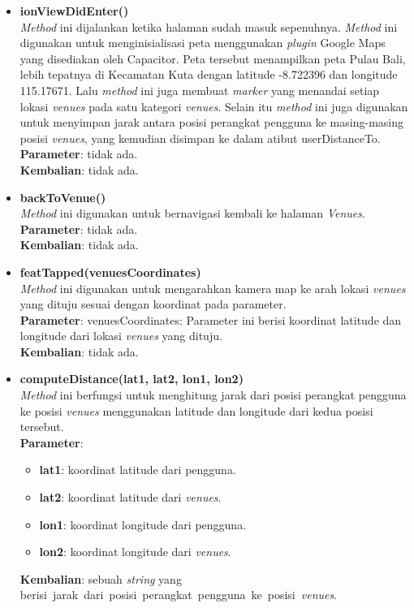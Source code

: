 \begin{enumerate}
\begin{itemize}
					\item \textbf{ionViewDidEnter()} \\
						\textit{Method} ini dijalankan ketika halaman sudah masuk sepenuhnya. \textit{Method} ini digunakan untuk menginisialisasi peta menggunakan \textit{plugin} Google Maps yang disediakan oleh Capacitor. Peta tersebut menampilkan peta Pulau Bali, lebih tepatnya di Kecamatan Kuta dengan latitude -8.722396 dan longitude 115.17671. Lalu \textit{method} ini juga membuat \textit{marker} yang menandai setiap lokasi \textit{venues} pada satu kategori \textit{venues}. Selain itu \textit{method} ini juga digunakan untuk menyimpan jarak antara posisi perangkat pengguna ke masing-masing posisi \textit{venues}, yang kemudian disimpan ke dalam atibut userDistanceTo.\\
						\textbf{Parameter}: tidak ada. \\
						\textbf{Kembalian}: tidak ada.
						
					\item \textbf{backToVenue()} \\
						\textit{Method} ini digunakan untuk bernavigasi kembali ke halaman \textit{Venues}. \\
						\textbf{Parameter}: tidak ada. \\
						\textbf{Kembalian}: tidak ada.
						
					\item \textbf{featTapped(venuesCoordinates)} \\
						\textit{Method} ini digunakan untuk mengarahkan kamera map ke arah lokasi \textit{venues} yang dituju sesuai dengan koordinat pada parameter. \\
						\textbf{Parameter}: venuesCoordinates: Parameter ini berisi koordinat latitude dan longitude dari lokasi \textit{venues} yang dituju. \\
						\textbf{Kembalian}: tidak ada.
						
					\item \textbf{computeDistance(lat1, lat2, lon1, lon2)} \\
						\textit{Method} ini berfungsi untuk menghitung jarak dari posisi perangkat pengguna ke posisi \textit{venues} menggunakan latitude dan longitude dari kedua posisi tersebut.\\
						\textbf{Parameter}: 
						\begin{itemize}
							\item \textbf{lat1}: koordinat latitude dari pengguna.
							\item \textbf{lat2}: koordinat latitude dari \textit{venues}.
							\item \textbf{lon1}: koordinat longitude dari pengguna.
							\item \textbf{lon2}: koordinat longitude dari \textit{venues}.
						\end{itemize}
						\textbf{Kembalian}: sebuah \textit{string} yang berisi~jarak~dari~posisi~perangkat~pengguna~ke~posisi~\textit{venues}.
				\end{itemize}
\end{enumerate}

